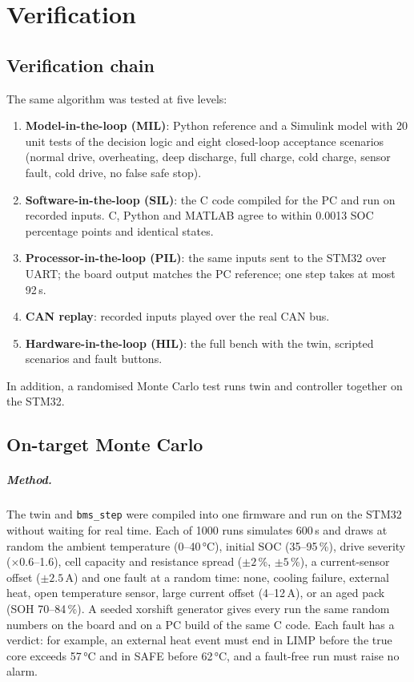 \chapter{Verification}\label{ch:verification}

\section{Verification chain}\label{sec:chain}
The same algorithm was tested at five levels:
\begin{enumerate}
  \item \textbf{Model-in-the-loop (MIL)}: Python reference and a Simulink model with 20 unit tests of the decision logic and eight closed-loop acceptance scenarios (normal drive, overheating, deep discharge, full charge, cold charge, sensor fault, cold drive, no false safe stop).
  \item \textbf{Software-in-the-loop (SIL)}: the C code compiled for the PC and run on recorded inputs. C, Python and MATLAB agree to within 0.0013 SOC percentage points and identical states.
  \item \textbf{Processor-in-the-loop (PIL)}: the same inputs sent to the STM32 over UART; the board output matches the PC reference; one step takes at most 92\,\textmu s.
  \item \textbf{CAN replay}: recorded inputs played over the real CAN bus.
  \item \textbf{Hardware-in-the-loop (HIL)}: the full bench with the twin, scripted scenarios and fault buttons.
\end{enumerate}
In addition, a randomised Monte Carlo test runs twin and controller together on the STM32.

\section{On-target Monte Carlo}\label{sec:mc}
\paragraph{Method.} The twin and \texttt{bms\_step} were compiled into one firmware and run on the STM32 without waiting for real time. Each of 1000 runs simulates 600\,s and draws at random the ambient temperature (0--40\,°C), initial SOC (35--95\,\%), drive severity ($\times$0.6--1.6), cell capacity and resistance spread ($\pm2$\,\%, $\pm5$\,\%), a current-sensor offset ($\pm2.5$\,A) and one fault at a random time: none, cooling failure, external heat, open temperature sensor, large current offset (4--12\,A), or an aged pack (SOH 70--84\,\%). A seeded xorshift generator gives every run the same random numbers on the board and on a PC build of the same C code. Each fault has a verdict: for example, an external heat event must end in LIMP before the true core exceeds 57\,°C and in SAFE before 62\,°C, and a fault-free run must raise no alarm.

